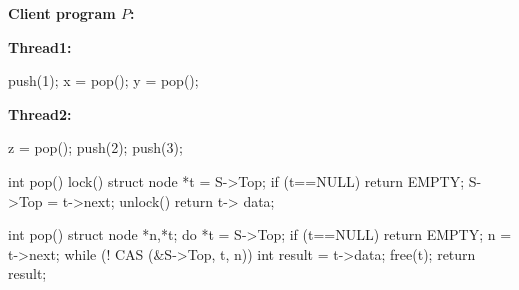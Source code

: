 \begin{figure*}[t]
{\begin{minipage}{14cm}
\begin{minipage}{3.7cm}
\lstset{numbers=none}
{\bf Client program $P$:}
\\
\begin{minipage}{1.7cm}
\bigskip
{\bf Thread1:}
\vspace{-1mm}
\begin{program}
push(1);
x = pop();
y = pop();
\end{program}
\end{minipage}
\begin{minipage}{1.6cm}
\bigskip
{\bf Thread2:}
\vspace{-1mm}
\begin{program}
z = pop();
push(2);
push(3);
\end{program}
\end{minipage}
\end{minipage}
\begin{minipage}{4.7cm}
\lstset{firstnumber=10}
\begin{program}
int pop() {
	lock()
	struct node *t = S->Top;
	if (t==NULL)
		return EMPTY;
	S->Top = t->next;
	unlock()
	return t-> data;
}
\end{program}
\end{minipage}
\begin{minipage}{6cm}
\lstset{firstnumber=10}
\begin{program}
int pop() {
	struct node *n,*t;
	do {
		*t = S->Top;
		if (t==NULL)
			return EMPTY;
		n = t->next;
	} while (! CAS (&S->Top, t, n))
	int result = t->data;
	free(t);
	return result;
}


\end{program}
\end{minipage}
\end{minipage}}
\end{figure*}
